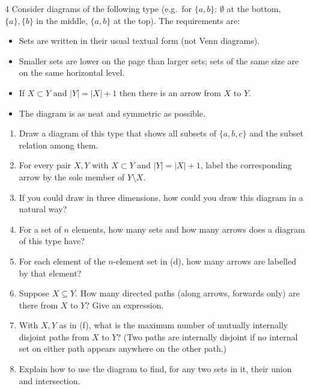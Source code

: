 \begin{exercise}{4}
    Consider diagrams of the following type (e.g.\ for $\{a,b\}$: $\emptyset$ at
    the bottom, $\{a\},\{b\}$ in the middle, $\{a,b\}$ at the top). The
    requirements are:
    \begin{itemize}
        \item Sets are written in their usual textual form (not Venn diagrams).
        \item Smaller sets are lower on the page than larger sets; sets of the
              same size are on the same horizontal level.
        \item If $X\subset Y$ and $|Y|=|X|+1$ then there is an arrow from $X$ to $Y$.
        \item The diagram is as neat and symmetric as possible.
    \end{itemize}
    \begin{enumerate}[label=(\alph*)]
        \item Draw a diagram of this type that shows all subsets of $\{a,b,c\}$
              and the subset relation among them.
        \item For every pair $X,Y$ with $X\subset Y$ and $|Y|=|X|+1$, label the
              corresponding arrow by the sole member of $Y\setminus X$.
        \item If you could draw in three dimensions, how could you draw this
              diagram in a natural way?
        \item For a set of $n$ elements, how many sets and how many arrows does a
              diagram of this type have?
        \item For each element of the $n$-element set in (d), how many arrows are
              labelled by that element?
        \item Suppose $X\subseteq Y$. How many directed paths (along arrows,
              forwards only) are there from $X$ to $Y$? Give an expression.
        \item With $X,Y$ as in (f), what is the maximum number of mutually
              internally disjoint paths from $X$ to $Y$? (Two paths are
              internally disjoint if no internal set on either path appears
              anywhere on the other path.)
        \item Explain how to use the diagram to find, for any two sets in it,
              their union and intersection.
    \end{enumerate}
\end{exercise}

